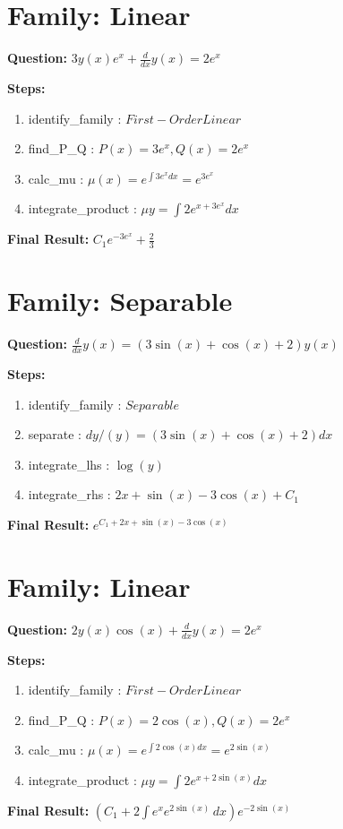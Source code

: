 \documentclass{article}
\begin{document}
\section*{Family: Linear}
\textbf{Question:} $3 y{\left(x \right)} e^{x} + \frac{d}{d x} y{\left(x \right)} = 2 e^{x}$

\textbf{Steps:}
\begin{enumerate}
\item identify_family :  $First-Order Linear$
\item find_P_Q :  $P(x)=3 e^{x}, Q(x)=2 e^{x}$
\item calc_mu :  $\mu(x) = e^{\int 3 e^{x} dx} = e^{3 e^{x}}$
\item integrate_product :  $\mu y = \int 2 e^{x + 3 e^{x}} dx$
\end{enumerate}
\textbf{Final Result:} $C_{1} e^{- 3 e^{x}} + \frac{2}{3}$

\section*{Family: Separable}
\textbf{Question:} $\frac{d}{d x} y{\left(x \right)} = \left(3 \sin{\left(x \right)} + \cos{\left(x \right)} + 2\right) y{\left(x \right)}$

\textbf{Steps:}
\begin{enumerate}
\item identify_family :  $Separable$
\item separate :  $dy / (y) = (3 \sin{\left(x \right)} + \cos{\left(x \right)} + 2) dx$
\item integrate_lhs :  $\log{\left(y \right)}$
\item integrate_rhs :  $2 x + \sin{\left(x \right)} - 3 \cos{\left(x \right)} + C_1$
\end{enumerate}
\textbf{Final Result:} $e^{C_{1} + 2 x + \sin{\left(x \right)} - 3 \cos{\left(x \right)}}$

\section*{Family: Linear}
\textbf{Question:} $2 y{\left(x \right)} \cos{\left(x \right)} + \frac{d}{d x} y{\left(x \right)} = 2 e^{x}$

\textbf{Steps:}
\begin{enumerate}
\item identify_family :  $First-Order Linear$
\item find_P_Q :  $P(x)=2 \cos{\left(x \right)}, Q(x)=2 e^{x}$
\item calc_mu :  $\mu(x) = e^{\int 2 \cos{\left(x \right)} dx} = e^{2 \sin{\left(x \right)}}$
\item integrate_product :  $\mu y = \int 2 e^{x + 2 \sin{\left(x \right)}} dx$
\end{enumerate}
\textbf{Final Result:} $\left(C_{1} + 2 \int e^{x} e^{2 \sin{\left(x \right)}}\, dx\right) e^{- 2 \sin{\left(x \right)}}$
\end{document}
